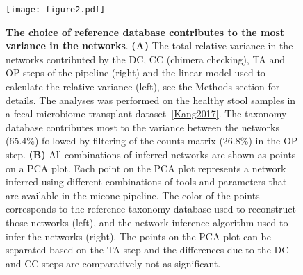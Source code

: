   \FloatBarrier
  \newpage

  \begin{figure}
    \centering
    \texttt{[image: figure2.pdf]}
  \end{figure}
  \begin{figure}
    \centering
      \caption{
      \textbf{The choice of reference database contributes to the most variance in the networks}.
      \textbf{(A)} The total relative variance in the networks contributed by the DC, CC (chimera checking), TA and OP steps of the pipeline (right) and the linear model used to calculate the relative variance (left), see the Methods section for details.
      The analyses was performed on the healthy stool samples in a fecal microbiome transplant dataset~\ref{Kang2017}.
      The taxonomy database contributes most to the variance between the networks (65.4\%) followed by filtering of the counts matrix (26.8\%) in the OP step.
      \textbf{(B)} All combinations of inferred networks are shown as points on a PCA plot.
      Each point on the PCA plot represents a network inferred using different combinations of tools and parameters that are available in the \ac{micone} pipeline.
      The color of the points corresponds to the reference taxonomy database used to reconstruct those networks (left), and the network inference algorithm used to infer the networks (right).
      The points on the PCA plot can be separated based on the TA step and the differences due to the DC and CC steps are comparatively not as significant.
    }
    \label{fig:figure2}
  \end{figure}
  \FloatBarrier
  \newpage

